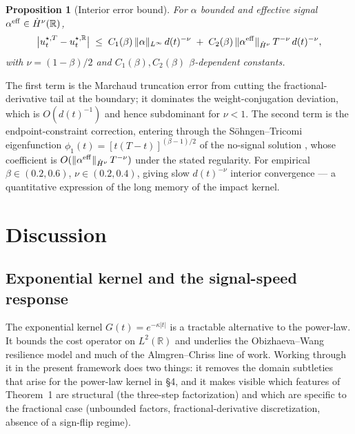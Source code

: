 \documentclass[11pt]{article}
\newcommand{\R}{\mathbb{R}}
\newcommand{\eff}{{\rm eff}}
\theoremstyle{plain}
\newtheorem{proposition}{Proposition}
\begin{document}
\begin{proposition}[Interior error bound]
For $\alpha$ bounded and effective signal $\alpha^{\eff}\in\dot H^\nu(\R)$,
\begin{equation}\label{eq:interior}
\bigl|u^{\star,T}_t - u^{\star,\R}_t\bigr| \;\le\; C_1(\beta)\,\|\alpha\|_{L^\infty}\, d(t)^{-\nu} \;+\; C_2(\beta)\,\|\alpha^{\eff}\|_{\dot H^\nu}\, T^{-\nu}\, d(t)^{-\nu},
\end{equation}
with $\nu = (1-\beta)/2$ and $C_1(\beta), C_2(\beta)$ $\beta$-dependent constants.
\end{proposition}

The first term is the Marchaud truncation error from cutting the fractional-derivative tail at the boundary; it dominates the weight-conjugation deviation, which is $O(d(t)^{-1})$ and hence subdominant for $\nu<1$. The second term is the endpoint-constraint correction, entering through the S\"ohngen--Tricomi eigenfunction $\phi_1(t) = [t(T-t)]^{(\beta-1)/2}$ of the no-signal solution \citep{GatheralSchiedSlynko2012,FordeSanchezSmith2022}, whose coefficient is $O(\|\alpha^{\eff}\|_{\dot H^\nu}\,T^{-\nu})$ under the stated regularity. For empirical $\beta\in(0.2,0.6)$, $\nu\in(0.2,0.4)$, giving slow $d(t)^{-\nu}$ interior convergence --- a quantitative expression of the long memory of the impact kernel.

\section{Discussion}

\subsection{Exponential kernel and the signal-speed response}

The exponential kernel $G(t) = e^{-\kappa|t|}$ is a tractable alternative to the power-law. It bounds the cost operator on $L^2(\R)$ and underlies the Obizhaeva--Wang \citeyearpar{ObizhaevaWang2013} resilience model and much of the Almgren--Chriss line of work. Working through it in the present framework does two things: it removes the domain subtleties that arise for the power-law kernel in \S4, and it makes visible which features of Theorem~1 are structural (the three-step factorization) and which are specific to the fractional case (unbounded factors, fractional-derivative discretization, absence of a sign-flip regime).
\end{document}
